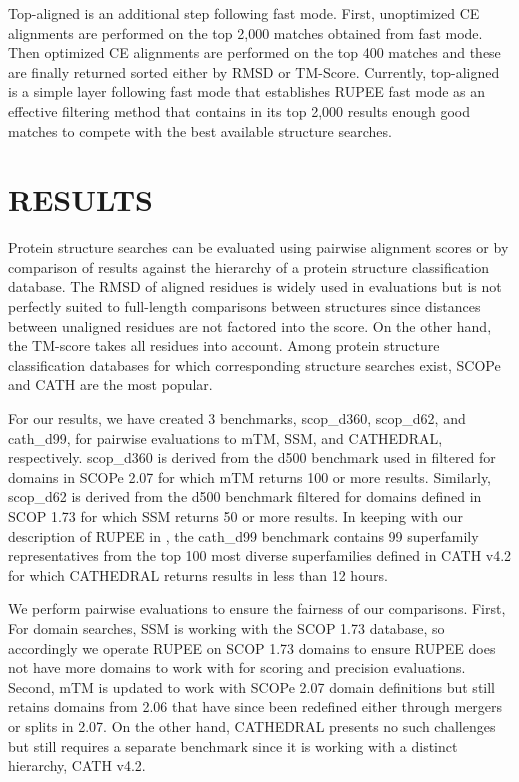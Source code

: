 \documentclass[letter,center,fleqn]{NAR}
\begin{document}
Top-aligned is an additional step following fast mode. 
First, unoptimized CE alignments are performed on the top 2,000 matches obtained from fast mode. 
Then optimized CE alignments are performed on the top 400 matches and these are finally returned sorted either by RMSD or TM-Score. 
Currently, top-aligned is a simple layer following fast mode that establishes RUPEE fast mode as an effective filtering method that contains in its top 2,000 results enough good matches to compete with the best available structure searches. 

\section{RESULTS}

Protein structure searches can be evaluated using pairwise alignment scores or by comparison of results against the hierarchy of a protein structure classification database.
The RMSD of aligned residues is widely used in evaluations but is not perfectly suited to full-length comparisons between structures since distances between unaligned residues are not factored into the score.
On the other hand, the TM-score \cite{Zhang2004} takes all residues into account. 
Among protein structure classification databases for which corresponding structure searches exist, SCOPe \citep{Fox2013} and CATH \citep{Orengo1997} are the most popular. 

For our results, we have created 3 benchmarks, scop\_d360, scop\_d62, and cath\_d99, for pairwise evaluations to mTM, SSM, and CATHEDRAL, respectively.
scop\_d360 is derived from the d500 benchmark used in \cite{Dong2018} filtered for domains in SCOPe 2.07 for which mTM returns 100 or more results.
Similarly, scop\_d62 is derived from the d500 benchmark filtered for domains defined in SCOP 1.73 for which SSM returns 50 or more results.  
In keeping with our description of RUPEE in \cite{Ayoub2017}, the cath\_d99 benchmark contains 99 superfamily representatives from the top 100 most diverse superfamilies defined in CATH v4.2 for which CATHEDRAL returns results in less than 12 hours. 

We perform pairwise evaluations to ensure the fairness of our comparisons. 
First, For domain searches, SSM is working with the SCOP 1.73 database, so accordingly we operate RUPEE on SCOP 1.73 domains to ensure RUPEE does not have more domains to work with for scoring and precision evaluations. 
Second, mTM is updated to work with SCOPe 2.07 domain definitions but still retains domains from 2.06 that have since been redefined either through mergers or splits in 2.07. 
On the other hand, CATHEDRAL presents no such challenges but still requires a separate benchmark since it is working with a distinct hierarchy, CATH v4.2. 
\end{document}
